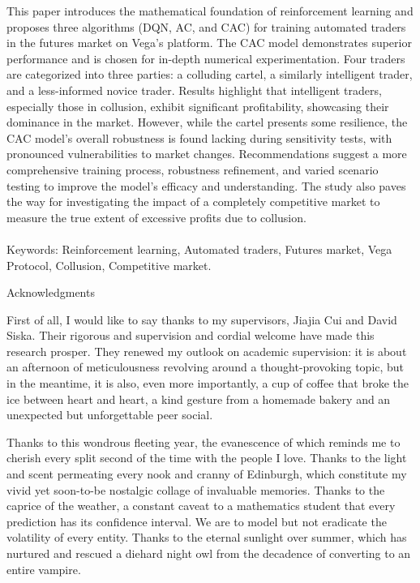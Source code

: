 \documentclass[11pt,twoside]{article}
\numberwithin{Theorem}{section}
\numberwithin{Definition}{section}
\numberwithin{Lemma}{section}
\numberwithin{Algorithm}{section}
\numberwithin{equation}{section}
\begin{document}
This paper introduces the mathematical foundation of reinforcement learning and proposes three algorithms (DQN, AC, and CAC) for training automated traders in the futures market on Vega’s platform. The CAC model demonstrates superior performance and is chosen for in-depth numerical experimentation. Four traders are categorized into three parties: a colluding cartel, a similarly intelligent trader, and a less-informed novice trader. Results highlight that intelligent traders, especially those in collusion, exhibit significant profitability, showcasing their dominance in the market. However, while the cartel presents some resilience, the CAC model's overall robustness is found lacking during sensitivity tests, with pronounced vulnerabilities to market changes. Recommendations suggest a more comprehensive training process, robustness refinement, and varied scenario testing to improve the model’s efficacy and understanding. The study also paves the way for investigating the impact of a completely competitive market to measure the true extent of excessive profits due to collusion.
\\ \\
Keywords: Reinforcement learning, Automated traders, Futures market, Vega Protocol, Collusion, Competitive market.

\clearpage

\begin{center}
\Large{Acknowledgments}
\end{center}

First of all, I would like to say thanks to my supervisors, Jiajia Cui and David Siska. Their rigorous and supervision and cordial welcome have made this research prosper. They renewed my outlook on academic supervision: it is about an afternoon of meticulousness revolving around a thought-provoking topic, but in the meantime, it is also, even more importantly, a cup of coffee that broke the ice between heart and heart, a kind gesture from a homemade bakery and an unexpected but unforgettable peer social.

Thanks to this wondrous fleeting year, the evanescence of which reminds me to cherish every split second of the time with the people I love. Thanks to the light and scent permeating every nook and cranny of Edinburgh, which constitute my vivid yet soon-to-be nostalgic collage of invaluable memories. Thanks to the caprice of the weather, a constant caveat to a mathematics student that every prediction has its confidence interval. We are to model but not eradicate the volatility of every entity. Thanks to the eternal sunlight over summer, which has nurtured and rescued a diehard night owl from the decadence of converting to an entire vampire. 
\end{document}
